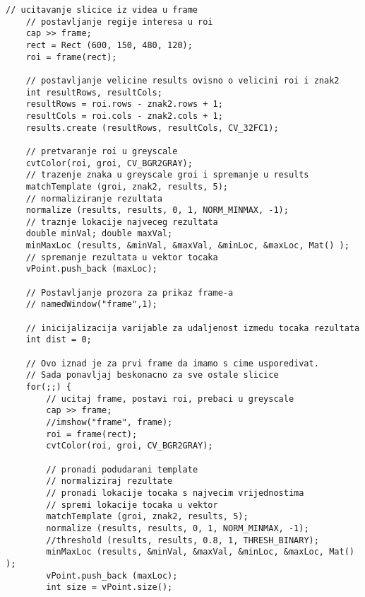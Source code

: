 \begin{lstlisting}[caption={}]
    // ucitavanje slicice iz videa u frame
    // postavljanje regije interesa u roi
    cap >> frame;
    rect = Rect (600, 150, 480, 120);
    roi = frame(rect);
    
    // postavljanje velicine results ovisno o velicini roi i znak2
    int resultRows, resultCols;
    resultRows = roi.rows - znak2.rows + 1;
    resultCols = roi.cols - znak2.cols + 1;
    results.create (resultRows, resultCols, CV_32FC1);

    // pretvaranje roi u greyscale
    cvtColor(roi, groi, CV_BGR2GRAY);      
    // trazenje znaka u greyscale groi i spremanje u results
    matchTemplate (groi, znak2, results, 5);
    // normaliziranje rezultata
    normalize (results, results, 0, 1, NORM_MINMAX, -1);
    // traznje lokacije najveceg rezultata
    double minVal; double maxVal;
    minMaxLoc (results, &minVal, &maxVal, &minLoc, &maxLoc, Mat() );
    // spremanje rezultata u vektor tocaka
    vPoint.push_back (maxLoc);
    
    // Postavljanje prozora za prikaz frame-a
    // namedWindow("frame",1);
    
    // inicijalizacija varijable za udaljenost izmedu tocaka rezultata
    int dist = 0;
    
    // Ovo iznad je za prvi frame da imamo s cime usporedivat.
    // Sada ponavljaj beskonacno za sve ostale slicice
    for(;;) {        
        // ucitaj frame, postavi roi, prebaci u greyscale
        cap >> frame;              
        //imshow("frame", frame);
        roi = frame(rect);
        cvtColor(roi, groi, CV_BGR2GRAY);
        
        // pronadi podudarani template
        // normaliziraj rezultate
        // pronadi lokacije tocaka s najvecim vrijednostima
        // spremi lokacije tocaka u vektor
        matchTemplate (groi, znak2, results, 5);
        normalize (results, results, 0, 1, NORM_MINMAX, -1);
        //threshold (results, results, 0.8, 1, THRESH_BINARY);
        minMaxLoc (results, &minVal, &maxVal, &minLoc, &maxLoc, Mat() );
        vPoint.push_back (maxLoc);
        int size = vPoint.size();
        

\end{lstlisting}
